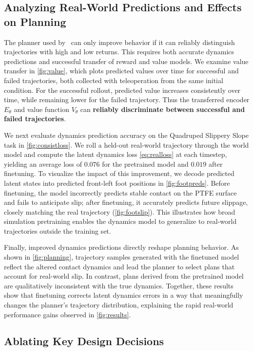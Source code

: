 \subsection{Analyzing Real-World Predictions and Effects on Planning}
\label{sec:ablations} The planner used by \Method\ can only improve behavior if it can reliably distinguish trajectories with high and low returns. This requires both accurate dynamics predictions and successful transfer of reward and value models. We examine value transfer in \cref{fig:value}, which plots predicted values over time for successful and failed trajectories, both collected with teleoperation from the same initial condition. For the successful rollout, predicted value increases consistently over time, while remaining lower for the failed trajectory. Thus the transferred encoder $E_\theta$ and value function $V_\theta$ can \textbf{reliably discriminate between successful and failed trajectories}.

We next evaluate dynamics prediction accuracy on the Quadruped Slippery Slope task in \cref{fig:consistloss}. We roll a held-out real-world trajectory through the world model and compute the latent dynamics loss \cref{eq:realloss} at each timestep, yielding an average loss of $0.076$ for the pretrained model and $0.019$ after finetuning. To visualize the impact of this improvement, we decode predicted latent states into predicted front-left foot positions in \cref{fig:footpreds}. Before finetuning, the model incorrectly predicts stable contact on the PTFE surface and fails to anticipate slip; after finetuning, it accurately predicts future slippage, closely matching the real trajectory (\cref{fig:footslip}). This illustrates how broad simulation pretraining enables the dynamics model to generalize to real-world trajectories outside the training set. 

Finally, improved dynamics predictions directly reshape planning behavior. As shown in \cref{fig:planning}, trajectory samples generated with the finetuned model reflect the altered contact dynamics and lead the planner to select plans that account for real-world slip. In contrast, plans derived from the pretrained model are qualitatively inconsistent with the true dynamics. Together, these results show that finetuning corrects latent dynamics errors in a way that meaningfully changes the planner’s trajectory distribution, explaining the rapid real-world performance gains observed in \cref{fig:results}.

\subsection{Ablating Key Design Decisions}





